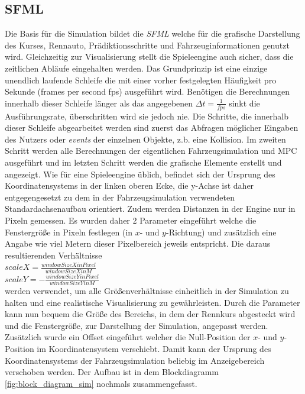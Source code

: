 \documentclass{like}
\begin{document}
\subsection{\acl{SFML}}
Die Basis für die Simulation bildet die \emph{ \ac{SFML}} welche für die grafische Darstellung des Kurses, Rennauto, Prädiktionsschritte und Fahrzeuginformationen genutzt wird. Gleichzeitig zur Visualisierung stellt die Spieleengine auch sicher, dass die zeitlichen Abläufe eingehalten werden. Das Grundprinzip ist eine einzige unendlich laufende Schleife die mit einer vorher festgelegten Häufigkeit pro Sekunde (frames per second fps) ausgeführt wird. Benötigen die Berechnungen innerhalb dieser Schleife länger als das angegebenen $\Delta t = \frac{1}{fps}$ sinkt die Ausführungsrate, überschritten wird sie jedoch nie. Die Schritte, die innerhalb dieser Schleife abgearbeitet werden sind zuerst das Abfragen möglicher Eingaben des Nutzers oder \emph{events} der einzelnen Objekte, z.b. eine Kollision. Im zweiten Schritt werden alle Berechnungen der eigentlichen Fahrzeugsimulation und \ac{MPC} ausgeführt und im letzten Schritt werden die grafische Elemente erstellt und angezeigt. Wie für eine Spieleengine üblich, befindet sich der Ursprung des Koordinatensystems in der linken oberen Ecke, die y-Achse ist daher entgegengesetzt zu dem in der Fahrzeugsimulation verwendeten Standardachsenaufbau orientiert. Zudem werden Distanzen in der Engine nur in Pixeln gemessen. Es wurden daher 2 Parameter eingeführt welche die Fenstergröße in Pixeln festlegen (in \(x\)- und  \(y\)-Richtung)
und zusätzlich eine Angabe wie viel Metern dieser Pixelbereich jeweils entspricht. Die daraus resultierenden Verhältnisse \\
$scaleX = \frac{windowSizeXinPixel}{windowSizeXinM}$ \\
$scaleY = - \frac{windowSizeYinPixel}{windowSizeYinM}$ \\
werden verwendet, um alle Größenverhältnisse einheitlich in der Simulation zu halten und eine realistische Visualisierung zu gewährleisten. Durch die Parameter kann nun bequem die Größe des Bereichs, in dem der Rennkurs abgesteckt wird und die Fenstergröße, zur Darstellung der Simulation, angepasst werden. Zusätzlich wurde ein Offset eingeführt welcher die Null-Position der \(x\)- und \(y\)- Position im Koordinatensystem verschiebt. Damit kann der Ursprung des Koordinatensystems der Fahrzeugsimulation beliebig im Anzeigebereich verschoben werden. 
Der Aufbau ist in dem Blockdiagramm \ref{fig:block_diagram_sim} nochmals zusammengefasst. 
\end{document}
